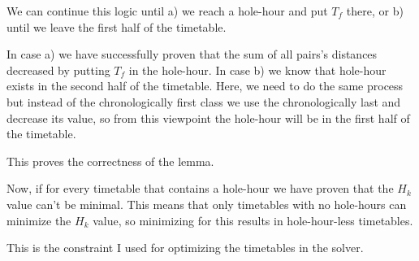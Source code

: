 We can continue this logic until a) we reach a hole-hour and put $T_f$ there, or b) until we leave the first half of the timetable.

In case a) we have successfully proven that the sum of all pairs's distances decreased by putting $T_f$ in the hole-hour. In case b) we know that hole-hour exists in the second half of the timetable. Here, we need to do the same process but instead of the chronologically first class we use the chronologically last and decrease its value, so from this viewpoint the hole-hour will be in the first half of the timetable.

This proves the correctness of the lemma.

Now, if for every timetable that contains a hole-hour we have proven that the $H_k$ value can't be minimal. This means that only timetables with no hole-hours can minimize the $H_k$ value, so minimizing for this results in hole-hour-less timetables.

This is the constraint I used for optimizing the timetables in the solver.

